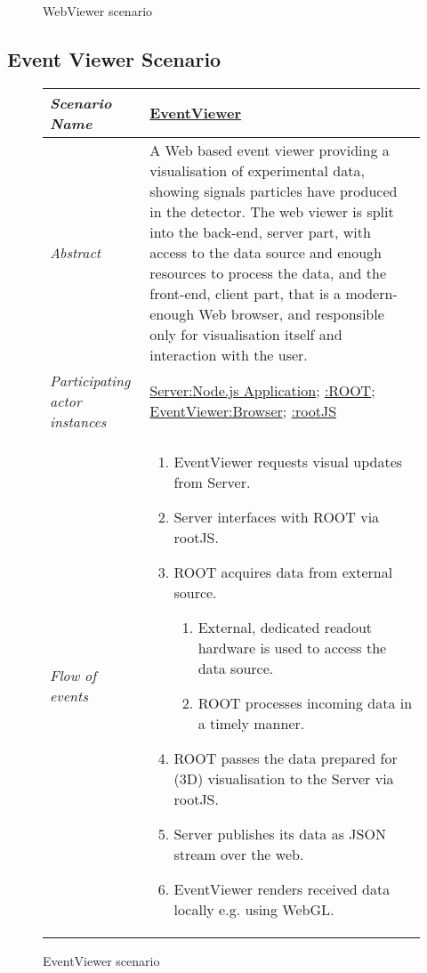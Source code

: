 \begin{figure}[htb]
\begin{longtable}{p{3cm} @{\hskip 1cm} p{12cm}}
	\end{longtable}
	
	\caption{WebViewer scenario}
	
\end{figure}

\pagebreak[4]

\subsection{Event Viewer Scenario}
\begin{figure}[htb]
	\centering
	\begin{longtable}{p{3cm} @{\hskip 1cm} p{12cm}}
		\hline
		\textit{Scenario Name} & \underline{EventViewer}\\
		\hline
		\textit{Abstract} &
		A Web based event viewer providing a visualisation of experimental data, showing signals particles have produced in the detector.
		The web viewer is split into the back-end, server part, with access to
	    the data source and enough resources to process the data, and the front-end, client part, that is a modern-enough Web browser, and responsible only for visualisation itself and interaction with the user.
		\\
		\hline
		\textit{Participating actor instances} & 
		\underline{Server:Node.js Application}; \underline{:ROOT}; \underline{EventViewer:Browser}; \underline{:rootJS}\\
		\hline
		\textit{Flow of events} &
		\begin{enumerate}
			\item EventViewer requests visual updates from Server.
			\item Server interfaces with ROOT via rootJS.
			\item ROOT acquires data from external source.
			\begin{enumerate}
					\item External, dedicated readout hardware is used to access the data source.
					\item ROOT processes incoming data in a timely manner.
			\end{enumerate}
			\item ROOT passes the data prepared for (3D) visualisation to the Server via rootJS.
			\item Server publishes its data as JSON stream over the web.
			\item EventViewer renders received data locally e.g. using WebGL.
		\end{enumerate}
		\\
		\hline
	\end{longtable}
	\caption{EventViewer scenario}
\end{figure}

